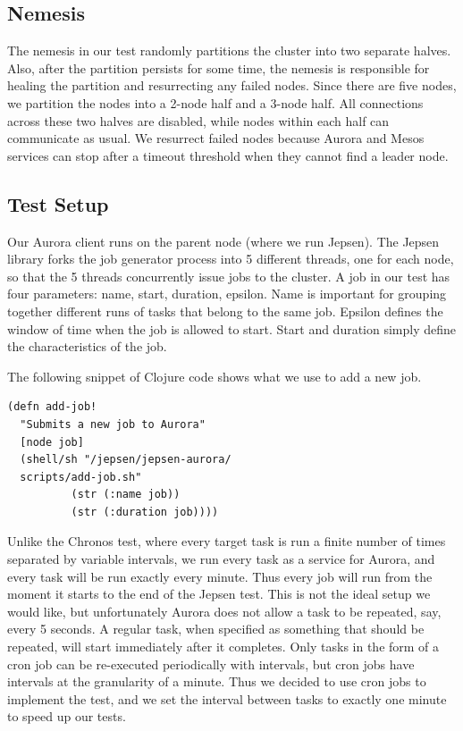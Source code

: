 \documentclass[letterpaper,twocolumn,10pt]{article}
\begin{document}
\subsection{Nemesis}
The nemesis in our test randomly partitions the cluster into two separate halves. Also, after the partition persists for some time, the nemesis is responsible for healing the partition and resurrecting any failed nodes. Since there are five nodes, we partition the nodes into a 2-node half and a 3-node half. All connections across these two halves are disabled, while nodes within each half can communicate as usual. We resurrect failed nodes because Aurora and Mesos services can stop after a timeout threshold when they cannot find a leader node. 

\subsection{Test Setup}
Our Aurora client runs on the parent node (where we run Jepsen). The Jepsen library forks the job generator process into 5 different threads, one for each node, so that the 5 threads concurrently issue jobs to the cluster. A job in our test has four parameters: name, start, duration, epsilon. Name is important for grouping together different runs of tasks that belong to the same job. Epsilon defines the window of time when the job is allowed to start. Start and duration simply define the characteristics of the job.


The following snippet of Clojure code shows what we use to add a new job.
\begin{verbatim}
(defn add-job!
  "Submits a new job to Aurora"
  [node job]
  (shell/sh "/jepsen/jepsen-aurora/
  scripts/add-job.sh" 
          (str (:name job))
          (str (:duration job))))
\end{verbatim}

Unlike the Chronos test, where every target task is run a finite number of times separated by variable intervals, we run every task as a service for Aurora, and every task will be run exactly every minute. Thus every job will run from the moment it starts to the end of the Jepsen test. This is not the ideal setup we would like, but unfortunately Aurora does not allow a task to be repeated, say, every 5 seconds. A regular task, when specified as something that should be repeated, will start immediately after it completes. Only tasks in the form of a cron job can be re-executed periodically with intervals, but cron jobs have intervals at the granularity of a minute. Thus we decided to use cron jobs to implement the test, and we set the interval between tasks to exactly one minute to speed up our tests. 
\end{document}
